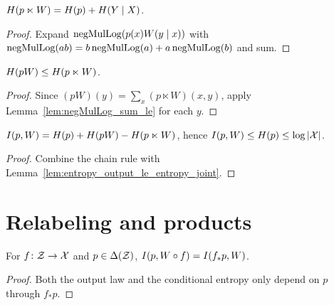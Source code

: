 \begin{theorem}
  \label{thm:entropy_joint}
  \leanok
  $H(p \ltimes W) = H(p) + H(Y \mid X)$.
\end{theorem}
\begin{proof}
  \leanok
  Expand $\operatorname{negMulLog}(p(x) W(y \mid x))$ with $\operatorname{negMulLog}(ab) = b\operatorname{negMulLog}(a) + a\operatorname{negMulLog}(b)$ and sum.
\end{proof}

\begin{lemma}
  \label{lem:entropy_output_le_entropy_joint}
  \leanok
  $H(pW) \le H(p \ltimes W)$.
\end{lemma}
\begin{proof}
  \leanok
  Since $(pW)(y) = \sum_x (p \ltimes W)(x, y)$, apply Lemma~\ref{lem:negMulLog_sum_le} for each $y$.
\end{proof}

\begin{theorem}
  \label{thm:mutualInfo_le_entropy}
  \leanok
  $I(p, W) = H(p) + H(pW) - H(p \ltimes W)$, hence $I(p, W) \le H(p) \le \log|\mathcal X|$.
\end{theorem}
\begin{proof}
  \leanok
  Combine the chain rule with Lemma~\ref{lem:entropy_output_le_entropy_joint}.
\end{proof}

\section{Relabeling and products}

\begin{theorem}
  \label{thm:mutualInfo_comp}
  \leanok
  For $f \colon \mathcal Z \to \mathcal X$ and $p \in \Delta(\mathcal Z)$, $I(p, W \circ f) = I(f_* p, W)$.
\end{theorem}
\begin{proof}
  \leanok
  Both the output law and the conditional entropy only depend on $p$ through $f_* p$.
\end{proof}

